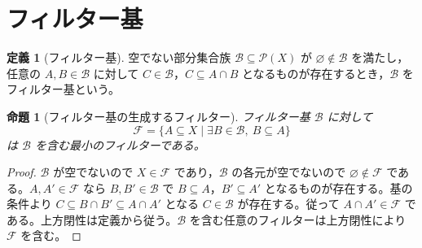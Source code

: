 \documentclass[a5paper,10pt,dvipdfmx]{jsarticle}
\theoremstyle{definition}
\newtheorem{defn}[ruledef]{定義}
\theoremstyle{plain}
\newtheorem{prop}[ruledef]{命題}
\newcommand{\Pow}{\mathcal{P}}
\begin{document}
\section{フィルター基}
\begin{defn}[フィルター基]\label{k235}
空でない部分集合族 $\mathcal B\subseteq\Pow(X)$ が $\varnothing\notin\mathcal B$ を満たし，任意の $A,B\in\mathcal B$ に対して $C\in\mathcal B$，$C\subseteq A\cap B$ となるものが存在するとき，$\mathcal B$ をフィルター基という。
\end{defn}
\begin{prop}[フィルター基の生成するフィルター]\label{k236}
フィルター基 $\mathcal B$ に対して
\[
 \mathcal F=\{A\subseteq X\mid
          \exists B\in\mathcal B,\ B\subseteq A\}
\]
は $\mathcal B$ を含む最小のフィルターである。
\end{prop}
\begin{proof}
$\mathcal B$ が空でないので $X\in\mathcal F$ であり，$\mathcal B$ の各元が空でないので $\varnothing\notin\mathcal F$ である。$A,A'\in\mathcal F$ なら $B,B'\in\mathcal B$ で $B\subseteq A$，$B'\subseteq A'$ となるものが存在する。基の条件より $C\subseteq B\cap B'\subseteq A\cap A'$ となる $C\in\mathcal B$ が存在する。従って $A\cap A'\in\mathcal F$ である。上方閉性は定義から従う。$\mathcal B$ を含む任意のフィルターは上方閉性により $\mathcal F$ を含む。
\end{proof}
\end{document}
